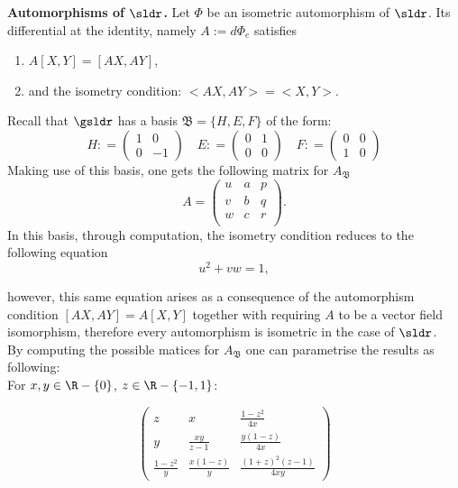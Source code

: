 \documentclass[11pt]{amsart}
\theoremstyle{plain}
\theoremstyle{definition}
\theoremstyle{remark}
\begin{document}
{\bf Automorphisms of $\sldr$.} Let $\Phi$ be an isometric automorphism of $\sldr$. Its differential at the identity, namely $A:= d \Phi_{e}$  satisfies 
\begin{enumerate}
\item $A[X,Y]=[AX,AY]$,
\item and the isometry condition:
$<AX,AY>=<X,Y>.$
\end{enumerate}
Recall that $\gsldr$ has a basis $\mathfrak{B}=\{H, E, F\}$ of the form:
$$H: = \left( \begin{matrix} 1 & 0 \\ 0 & -1 \end{matrix} \right) \quad 
E: = \left( \begin{matrix} 0 & 1 \\ 0 & 0 \end{matrix} \right) \quad 
F: = \left( \begin{matrix} 0 & 0 \\ 1 & 0 \end{matrix} \right) $$
Making use of this basis, one gets the following matrix for $A_\mathfrak{B}$
\[A= {\begin{pmatrix} 
   u & a & p \\
   v & b & q \\
   w & c & r \\
  \end{pmatrix} } .
\]
In this basis, through computation, the isometry condition reduces to the following equation 
\begin{equation*}\label{isomcond}
u^2+vw=1,
\end{equation*}

however, this same equation arises as a consequence of the automorphism condition $[AX,AY]=A[X,Y]$ together with requiring $A$ to be a vector field isomorphism, therefore every automorphism is isometric in the case of $\sldr$.\\

By computing the possible matices for $A_\mathfrak{B}$ one can parametrise the results as following:\\

For $x,y \in \R-\{0\}$,  $z \in \R- \{-1,1 \}$:

\setlength{\belowdisplayskip}{6pt} \setlength{\belowdisplayshortskip}{6pt}
\setlength{\abovedisplayskip}{6pt} \setlength{\abovedisplayshortskip}{6pt}



\begin{center}
\begin{equation}\label{xyz}
\begin{pmatrix}
   z & x & \frac{1-z^2}{4 x} \\[6pt]
   y & \frac{x y}{z-1} & \frac{y (1-z)}{4 x} \\[6pt]
   \frac{1-z^2}{y} & \frac{x (1-z)}{y} & \frac{(1+z)^2(z-1)}{4 x y} 
\end{pmatrix}
\end{equation}
\end{center}
    
\end{document}
